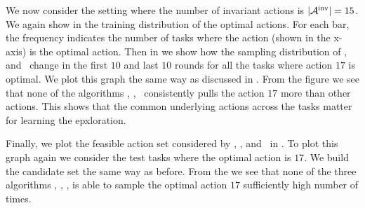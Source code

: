 We now consider the setting where the number of invariant actions is $|\mathcal{A}^{\text{inv}}| = 15$.
% 
%
We again show in  the training distribution of the optimal actions. For each bar, the frequency indicates the number of tasks where the action (shown in the x-axis) is the optimal action. Then in  we show how the sampling distribution of \dptg, \pred\, and \predt\ change in the first $10$ and last $10$ rounds for all the tasks where action $17$ is optimal. We plot this graph the same way as discussed in .
%
%
From the figure  we see that none of the algorithms \pred, \predt, \dptg\ consistently pulls the action $17$ more than other actions. This shows that the common underlying actions across the tasks matter for learning the epxloration.

Finally, we plot the feasible action set considered by \dptg, \pred, and \predt\ in . To plot this graph again we consider the test tasks where the optimal action is $17$. We build the candidate set the same way as before. From the  we see that none of the three algorithms \dptg, \pred, \predt, is able to sample the optimal action $17$ sufficiently high number of times.



